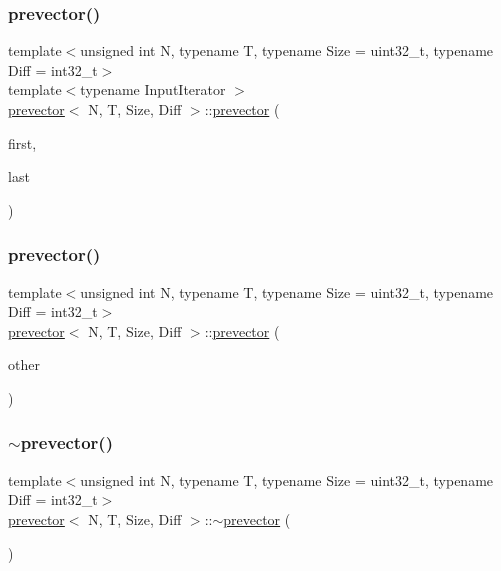 \subsubsection{\texorpdfstring{prevector()}{prevector()}\hspace{0.1cm}{\footnotesize\ttfamily [4/5]}}
{\footnotesize\ttfamily template$<$unsigned int N, typename T, typename Size = uint32\+\_\+t, typename Diff = int32\+\_\+t$>$ \\
template$<$typename Input\+Iterator $>$ \\
\mbox{\hyperlink{classprevector}{prevector}}$<$ N, T, Size, Diff $>$\+::\mbox{\hyperlink{classprevector}{prevector}} (\begin{DoxyParamCaption}\item[{Input\+Iterator}]{first,  }\item[{Input\+Iterator}]{last }\end{DoxyParamCaption})\hspace{0.3cm}{\ttfamily [inline]}}

\mbox{\label{classprevector_abab195dce86a4b44bab7a5e9809a522c}} 
\subsubsection{\texorpdfstring{prevector()}{prevector()}\hspace{0.1cm}{\footnotesize\ttfamily [5/5]}}
{\footnotesize\ttfamily template$<$unsigned int N, typename T, typename Size = uint32\+\_\+t, typename Diff = int32\+\_\+t$>$ \\
\mbox{\hyperlink{classprevector}{prevector}}$<$ N, T, Size, Diff $>$\+::\mbox{\hyperlink{classprevector}{prevector}} (\begin{DoxyParamCaption}\item[{const \mbox{\hyperlink{classprevector}{prevector}}$<$ N, T, Size, Diff $>$ \&}]{other }\end{DoxyParamCaption})\hspace{0.3cm}{\ttfamily [inline]}}

\mbox{\label{classprevector_a507bc6d153e291d93c885162e3a3a8f7}} 
\subsubsection{\texorpdfstring{$\sim$prevector()}{~prevector()}}
{\footnotesize\ttfamily template$<$unsigned int N, typename T, typename Size = uint32\+\_\+t, typename Diff = int32\+\_\+t$>$ \\
\mbox{\hyperlink{classprevector}{prevector}}$<$ N, T, Size, Diff $>$\+::$\sim$\mbox{\hyperlink{classprevector}{prevector}} (\begin{DoxyParamCaption}{ }\end{DoxyParamCaption})\hspace{0.3cm}{\ttfamily [inline]}}



